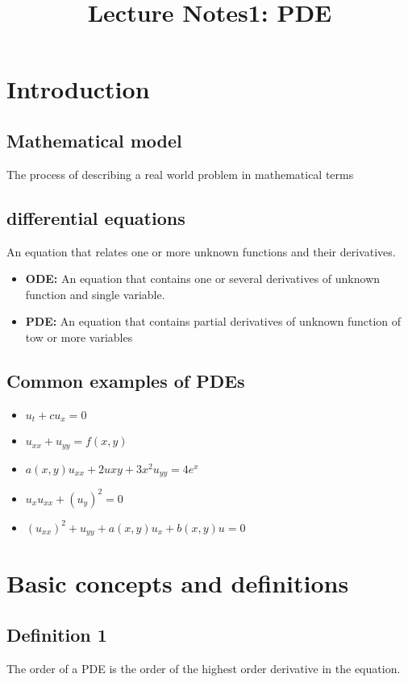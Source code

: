 \documentclass[12 pt]{article}
\title{\huge{Lecture Notes1: PDE}}
\author{}
\date{}
\begin{document}
\maketitle
\tableofcontents
\newpage
\section{Introduction}
\subsection{Mathematical model}
 The process of describing a real world problem in mathematical terms
 \subsection{differential equations}
 An equation that relates one or more unknown functions and their derivatives.
 \begin{itemize}
     \item \textbf{ODE:} An equation that contains one or several derivatives of unknown function and single variable.
     \item \textbf{PDE:} An equation that contains partial derivatives of unknown function of tow or more variables 
 \end{itemize}
 \subsection{Common examples of PDEs}
 \begin{itemize}
     \item $u_t +cu_x =0$
     \item $u_{xx} + u_{yy} =f(x,y)$
     \item $a(x,y)u_{xx}+2u{xy}+3x^2u_{yy}=4e^x$
     \item $u_xu_{xx}+(u_y)^2=0$
     \item $(u_{xx})^2+u_{yy}+a(x,y)u_x+b(x,y)u=0$
 \end{itemize}
 \section{Basic concepts and definitions}
 \subsection{Definition 1}
 The order of a PDE is the order of the highest order derivative in the equation.
\end{document}
